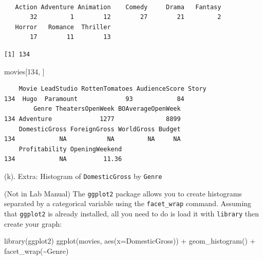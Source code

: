\documentclass[
]{book}
\newenvironment{Shaded}{\begin{snugshade}}{\end{snugshade}}
\newcommand{\AttributeTok}[1]{\textcolor[rgb]{0.77,0.63,0.00}{#1}}
\newcommand{\DecValTok}[1]{\textcolor[rgb]{0.00,0.00,0.81}{#1}}
\newcommand{\FunctionTok}[1]{\textcolor[rgb]{0.00,0.00,0.00}{#1}}
\newcommand{\NormalTok}[1]{#1}
\newcommand{\SpecialCharTok}[1]{\textcolor[rgb]{0.00,0.00,0.00}{#1}}
\newcommand{\StringTok}[1]{\textcolor[rgb]{0.31,0.60,0.02}{#1}}
\begin{document}
\begin{Shaded}
\end{Shaded}

\begin{verbatim}

   Action Adventure Animation    Comedy     Drama   Fantasy 
       32         1        12        27        21         2 
   Horror   Romance  Thriller 
       17        11        13 
\end{verbatim}

\begin{Shaded}
\end{Shaded}

\begin{verbatim}
[1] 134
\end{verbatim}

\begin{Shaded}
\begin{Highlighting}[]
\NormalTok{movies[}\DecValTok{134}\NormalTok{, ]}
\end{Highlighting}
\end{Shaded}

\begin{verbatim}
    Movie LeadStudio RottenTomatoes AudienceScore Story
134  Hugo  Paramount             93            84      
        Genre TheatersOpenWeek BOAverageOpenWeek
134 Adventure             1277              8899
    DomesticGross ForeignGross WorldGross Budget
134            NA           NA         NA     NA
    Profitability OpeningWeekend
134            NA          11.36
\end{verbatim}

(k). Extra: Histogram of \texttt{DomesticGross} by \texttt{Genre}

(Not in Lab Manual) The \texttt{ggplot2} package allows you to create histograms separated by a categorical variable using the \texttt{facet\_wrap} command. Assuming that \texttt{ggplot2} is already installed, all you need to do is load it with \texttt{library} then create your graph:

\begin{Shaded}
\begin{Highlighting}[]
\FunctionTok{library}\NormalTok{(ggplot2)}
\FunctionTok{ggplot}\NormalTok{(movies, }\FunctionTok{aes}\NormalTok{(}\AttributeTok{x=}\NormalTok{DomesticGross)) }\SpecialCharTok{+} 
  \FunctionTok{geom\_histogram}\NormalTok{() }\SpecialCharTok{+} 
  \FunctionTok{facet\_wrap}\NormalTok{(}\SpecialCharTok{\textasciitilde{}}\NormalTok{Genre)}
\end{Highlighting}
\end{Shaded}
\end{document}
